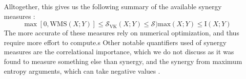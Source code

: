 \documentclass[../main.tex]{subfiles}
\begin{document}
Alltogether, this gives us the following summary of the available synergy measures \cite{griffith2014quantifying}:
%
\begin{equation}
\max [0,\mathrm{WMS}(X;Y)] \le \mathcal{S}_\mathrm{VK} (X;Y) \le \mathcal{S})\mathrm{max} (X;Y) \le \mathrm{I}(X;Y)
\end{equation}
%
The more accurate of these measures rely on numerical optimization, and thus require more effort to compute.s
Other notable quantifiers used of synergy measures are the correlational importance, which we do not discuss as it was found to measure something else than synergy, and the synergy from maximum entropy arguments, which can take negative values \cite{griffith2014quantifying, olbrich2015information}.
\end{document}
